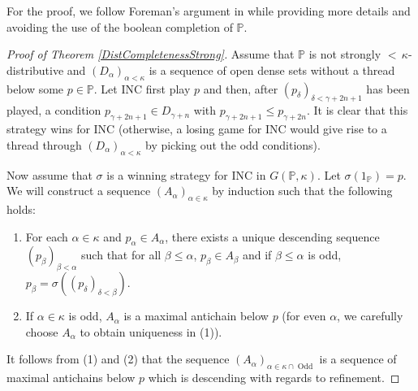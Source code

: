 \documentclass[12pt]{amsart}
\theoremstyle{definition}
\theoremstyle{remark}
\theoremstyle{plain}
\numberwithin{mydef}{section}
\DeclareMathOperator{\Odd}{Odd}
\newcommand{\dP}{\mathbb{P}}
\begin{document}
	For the proof, we follow Foreman's argument in \cite{ForemanBool} while providing more details and avoiding the use of the boolean completion of $\dP$.
	
	\begin{proof}[Proof of Theorem \ref{DistCompletenessStrong}]
		Assume that $\dP$ is not strongly ${<}\,\kappa$-distributive and $(D_{\alpha})_{\alpha<\kappa}$ is a sequence of open dense sets without a thread below some $p\in\dP$. Let INC first play $p$ and then, after $(p_{\delta})_{\delta<\gamma+2n+1}$ has been played, a condition $p_{\gamma+2n+1}\in D_{\gamma+n}$ with $p_{\gamma+2n+1}\leq p_{\gamma+2n}$. It is clear that this strategy wins for INC (otherwise, a losing game for INC would give rise to a thread through $(D_{\alpha})_{\alpha<\kappa}$ by picking out the odd conditions).
		
		Now assume that $\sigma$ is a winning strategy for INC in $G(\dP,\kappa)$. Let $\sigma(1_{\dP})=p$. We will construct a sequence $(A_{\alpha})_{\alpha\in\kappa}$ by induction such that the following holds:
		\begin{enumerate}
			\item For each $\alpha\in\kappa$ and $p_{\alpha}\in A_{\alpha}$, there exists a unique descending sequence $(p_{\beta})_{\beta<\alpha}$ such that for all $\beta\leq\alpha$, $p_{\beta}\in A_{\beta}$ and if $\beta\leq\alpha$ is odd, $p_{\beta}=\sigma((p_{\delta})_{\delta<\beta})$.
			\item If $\alpha\in\kappa$ is odd, $A_{\alpha}$ is a maximal antichain below $p$ (for even $\alpha$, we carefully choose $A_{\alpha}$ to obtain uniqueness in (1)).
		\end{enumerate}
		It follows from (1) and (2) that the sequence $(A_{\alpha})_{\alpha\in\kappa\cap\Odd}$ is a sequence of maximal antichains below $p$ which is descending with regards to refinement.
		

\end{proof}
\end{document}
